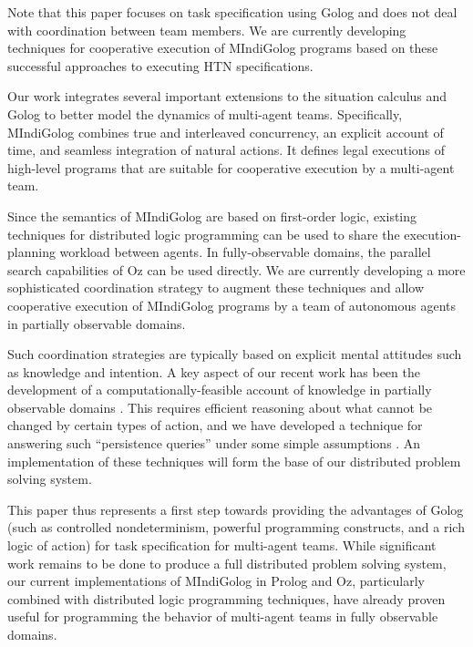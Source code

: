 \documentclass[times, 10pt, twocolumn]{article}
\begin{document}
Note that this paper focuses on task specification using Golog and
does not deal with coordination between team members. We are currently
developing techniques for cooperative execution of MIndiGolog programs
based on these successful approaches to executing HTN specifications.



Our work integrates several important extensions to the situation
calculus and Golog to better model the dynamics of multi-agent teams.
Specifically, MIndiGolog combines true and interleaved concurrency,
an explicit account of time, and seamless integration of natural actions.
It defines legal executions of high-level programs that are suitable
for cooperative execution by a multi-agent team.

Since the semantics of MIndiGolog are based on first-order logic,
existing techniques for distributed logic programming can be used
to share the execution-planning workload between agents. In fully-observable
domains, the parallel search capabilities of Oz can be used directly.
We are currently developing a more sophisticated coordination strategy
to augment these techniques and allow cooperative execution of MIndiGolog
programs by a team of autonomous agents in partially observable domains.

Such coordination strategies are typically based on explicit mental
attitudes such as knowledge and intention. A key aspect of our recent
work has been the development of a computationally-feasible account
of knowledge in partially observable domains \cite{kelly07sc_know_obs}.
This requires efficient reasoning about what cannot be changed by
certain types of action, and we have developed a technique for answering
such {}``persistence queries'' under some simple assumptions \cite{kelly07sc_persistence}.
An implementation of these techniques will form the base of our distributed
problem solving system.

This paper thus represents a first step towards providing the advantages
of Golog (such as controlled nondeterminism, powerful programming
constructs, and a rich logic of action) for task specification for
multi-agent teams. While significant work remains to be done to produce
a full distributed problem solving system, our current implementations
of MIndiGolog in Prolog and Oz, particularly combined with distributed
logic programming techniques, have already proven useful for programming
the behavior of multi-agent teams in fully observable domains.

\end{document}
